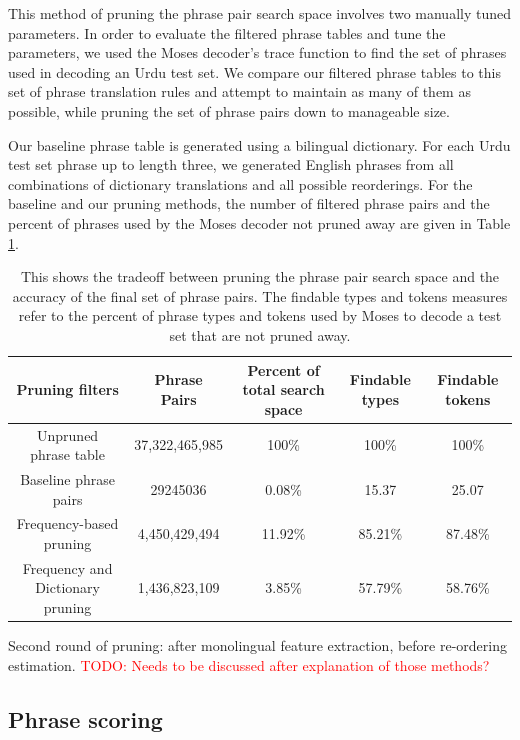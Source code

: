 \documentclass[11pt]{article}
\newcommand{\mnote}[1]{\marginpar{%
  \vskip-\baselineskip
  \raggedright\footnotesize
  \itshape\hrule\smallskip\tiny{#1}\par\smallskip\hrule}}
\newcommand{\mtodo}[1]{\mnote{\textcolor{red}{#1}}}
\newcommand{\todo}[1]{\textcolor{red}{TODO: #1}}
\begin{document}
This method of pruning the phrase pair search space involves two manually tuned parameters. In order to evaluate the filtered phrase tables and tune the parameters, we used the Moses decoder's trace function to find the set of phrases used in decoding an Urdu test set. \mtodo{data details?} We compare our filtered phrase tables to this set of phrase translation rules and attempt to maintain as many of them as possible, while pruning the set of phrase pairs down to manageable size. 

Our baseline phrase table is generated using a bilingual dictionary. For each Urdu test set phrase up to length three, we generated English phrases from all combinations of dictionary translations and all possible reorderings. For the baseline and our pruning methods, the number of filtered phrase pairs and the percent of phrases used by the Moses decoder not pruned away are given in Table \ref{table:prune}.  

\begin{table}
\small
\begin{center}
\label{table:prune}
\begin{tabular}{|c|c|c|c|c|}
\hline
Pruning filters & Phrase Pairs & Percent of total search space & Findable types & Findable tokens \\
\hline
Unpruned phrase table & 37,322,465,985 & 100\% & 100\% & 100\% \\
Baseline phrase pairs & 29245036 & 0.08\% & 15.37 & 25.07 \\
Frequency-based pruning & 4,450,429,494 & 11.92\% & 85.21\% & 87.48\% \\
Frequency and Dictionary pruning & 1,436,823,109 & 3.85\% & 57.79\% & 58.76\% \\
\hline
\end{tabular}
\caption{This shows the tradeoff between pruning the phrase pair search space and the accuracy of the final set of phrase pairs. The findable types and tokens measures refer to the percent of phrase types and tokens used by Moses to decode a test set that are not pruned away.}
\end{center}
\end{table}


Second round of pruning: after monolingual feature extraction, before re-ordering estimation. \todo{Needs to be discussed after explanation of those methods?}

\subsection{Phrase scoring} \label{sect:score}
\end{document}
